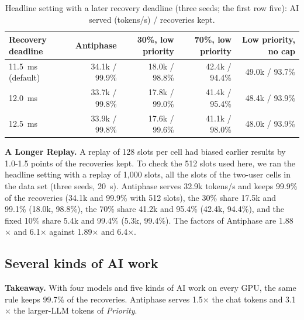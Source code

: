 \documentclass[acmsmall,screen,review,anonymous]{acmart}
\newcommand{\sys}{Antiphase\xspace}
\begin{document}
\begin{table}[t]
\caption{Headline setting with a later recovery deadline (three seeds; the first row five): AI served
(tokens/s) / recoveries kept.}
\label{tab:deadline}
\footnotesize
\begin{tabular}{@{}lrrrr@{}}
\toprule
Recovery deadline & \sys & 30\%, low priority & 70\%, low priority & Low priority, no cap \\
\midrule
11.5~ms (default) & 34.1k / 99.9\% & 18.0k / 98.8\% & 42.4k / 94.4\% & 49.0k / 93.7\% \\
12.0~ms & 33.7k / 99.8\% & 17.8k / 99.0\% & 41.4k / 95.4\% & 48.4k / 93.9\% \\
12.5~ms & 33.9k / 99.8\% & 17.6k / 99.6\% & 41.1k / 98.0\% & 48.0k / 93.9\% \\
\bottomrule
\end{tabular}
\end{table}

\noindent\textbf{A Longer Replay.} A replay of 128 slots per cell had biased earlier results by 1.0-1.5
points of the recoveries kept. To check the 512 slots used here, we ran the headline setting with a replay
of 1,000 slots, all the slots of the two-user cells in the data set (three seeds, 20~s). \sys serves 32.9k
tokens/s and keeps 99.9\% of the recoveries (34.1k and 99.9\% with 512 slots), the 30\% share 17.5k and
99.1\% (18.0k, 98.8\%), the 70\% share 41.2k and 95.4\% (42.4k, 94.4\%), and the fixed 10\% share 5.4k and
99.4\% (5.3k, 99.4\%). The factors of \sys are 1.88$\times$ and 6.1$\times$ against 1.89$\times$ and
6.4$\times$.

\subsection{Several kinds of AI work}
\label{sec:kinds}

\noindent\textbf{Takeaway.} With four models and five kinds of AI work on every GPU, the same rule keeps
99.7\% of the recoveries. \sys serves 1.5$\times$ the chat tokens and 3.1$\times$ the larger-LLM tokens of
\textit{Priority}.
\end{document}
